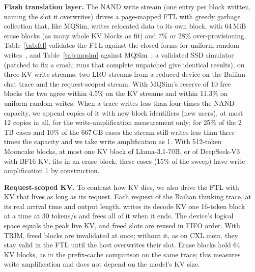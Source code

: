 \documentclass[acmsmall,screen,review]{acmart}
\begin{document}
\textbf{Flash translation layer.} The NAND write stream (one entry per block written, naming the
slot it overwrites) drives a page-mapped FTL with greedy garbage collection that, like MQSim,
writes relocated data to its own block, with 64\,MiB erase blocks (as many whole KV blocks as fit)
and 7\% or 28\% over-provisioning. Table~\ref{tab:ftl} validates the FTL against the closed forms
for uniform random writes~\cite{desnoyers}, and Table~\ref{tab:mqsim} against MQSim~\cite{mqsim},
a validated SSD simulator (patched to fix a crash; runs that complete unpatched give identical
results), on three KV write streams: two LRU streams from a reduced device on the Bailian chat
trace and the request-scoped stream. With MQSim's reserve of 10 free blocks the two agree within
4.5\% on the KV streams and within 11.3\% on uniform random writes. When a trace writes less than four
times the NAND capacity, we append copies of it with new block identifiers (new users), at most 12
copies in all, for the write-amplification measurement only; for 25\% of the 2\,TB cases and 10\% of
the 667\,GB cases the stream still writes less than three times the capacity and we take write
amplification as 1. With 512-token
Mooncake blocks, at most one KV block of Llama-3.1-70B, or of DeepSeek-V3 with BF16 KV, fits in an
erase block; these cases (15\% of the sweep) have write amplification 1 by construction.

\begin{table}[t]
\caption{FTL validation: uniform random overwrites, 40{,}000 units, 64 units per erase block.
Effective over-provisioning excludes the reserved free blocks.}
\label{tab:ftl}
\small

\end{table}

\begin{table}[t]
\caption{Write amplification on exported KV write streams and on uniform random writes (64 units
per erase block): MQSim and our FTL with MQSim's 10 reserved free blocks. MQSim collects up to 10
victims concurrently; given 9 more physical blocks to offset them, MQSim gives 7.52 on uniform
writes at 7\% (our FTL: 7.91 with its 10 reserved blocks) and 5.36 on the request-scoped stream.}
\label{tab:mqsim}
\small

\end{table}

\textbf{Request-scoped KV.} To contrast how KV dies, we also drive the FTL with KV that lives as long
as its request. Each request of the Bailian thinking trace, at its real arrival time and output
length, writes its decode KV one 16-token block at a time at 30 tokens/s and frees all of it when it
ends. The device's logical space equals the peak live KV, and freed slots are reused in FIFO order.
With TRIM, freed blocks are invalidated at once; without it, as on CXL.mem, they stay valid in the
FTL until the host overwrites their slot. Erase blocks hold 64 KV blocks, as in the prefix-cache
comparison on the same trace; this measures write amplification and does not depend on the model's
KV size.
\end{document}
